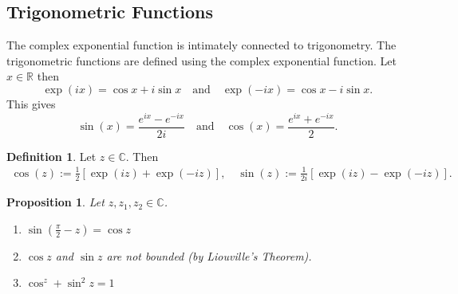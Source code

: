 \documentclass[12pt,openany]{book}
\newtheorem{proposition}[theorem]{Proposition}
\theoremstyle{definition}
\newtheorem{definition}{Definition}[chapter]
\newcommand{\R}{\mathbb{R}}
\newcommand{\C}{\mathbb{C}}
\newcommand{\of}[1]{\left( #1 \right)}
\begin{document}
	\subsection{Trigonometric Functions}
	The complex exponential function is intimately connected to trigonometry. The trigonometric functions are defined using the complex exponential function. Let $x\in\R$ then \[
	\exp\of{ix}=\cos x+i\sin x\quad\text{and}\quad\exp\of{-ix}=\cos x-i\sin x.
	\] This gives \[
	\sin(x) = \frac{e^{ix} - e^{-ix}}{2i}\quad\text{and}\quad\cos(x) = \frac{e^{ix} + e^{-ix}}{2}.	
	\] 
	\vspace{8pt}
	\begin{tcolorbox}[colback=white,colframe=defcolor,arc=5pt,title={\color{white}\bf Complex Trigonometric}]
		\begin{definition}
			Let $z\in\C$. Then \begin{align*}
			\cos\of{z}:=\frac{1}{2}\left[\exp(iz)+\exp(-iz)\right],\quad
			\sin\of{z}:=\frac{1}{2i}\left[\exp(iz)-\exp(-iz)\right].
			\end{align*}
		\end{definition}
	\end{tcolorbox}
	\vspace{8pt}
	\begin{tcolorbox}[colback=white,colframe=procolor,arc=5pt,title={\color{white}\bf Properties of Complex Trigonometric}]
		\begin{proposition}
			Let $z,z_1,z_2\in\C$. \begin{enumerate}[(1)]
				\item $\sin\of{\frac{\pi}{2}-z}=\cos z$
				\item $\cos z$ and $\sin z$ are not bounded (by Liouville's Theorem).
				\item $\cos^z+\sin^2z=1$
			\end{enumerate}
		\end{proposition}
	\end{tcolorbox}
	\newpage
\end{document}
